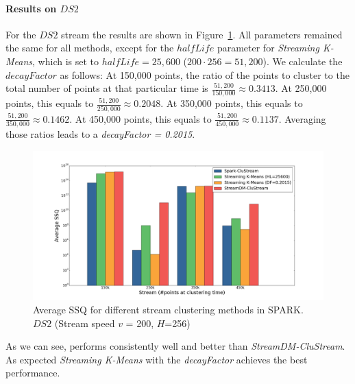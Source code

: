 \paragraph{Results on $DS2$}
For the $DS2$ stream the results are shown in Figure~\ref{fig:comparison200}.
All parameters remained the same for all methods, except for the $halfLife$ parameter for \textit{Streaming K-Means}, which is set to  $halfLife=25,600$ ($200\cdot 256=51,200$).
We calculate the $decayFactor$ as follows: 
At 150,000 points, the ratio of the points to cluster to the total number of points at that particular time is $\frac{51,200}{150,000} \approx 0.3413$.
At 250,000 points, this equals to $\frac{51,200}{250,000} \approx 0.2048$.
At 350,000 points, this equals to $\frac{51,200}{350,000} \approx 0.1462$.
At 450,000 points, this equals to $\frac{51,200}{450,000} \approx 0.1137$.
Averaging those ratios leads to a \textit{decayFactor = 0.2015}. %
\begin{figure}[h!]
 \centering
 \includegraphics[scale=0.15]{./styles/comparison200.png}
 \caption{Average SSQ for different stream clustering methods in SPARK. $DS2$ (Stream speed $v$ = 200, $H$=256)}
 \label{fig:comparison200}
\end{figure}
As we can see, \our performs consistently well and better than \textit{StreamDM-CluStream}. As expected \textit{Streaming K-Means} with the \textit{decayFactor} achieves the best performance.

